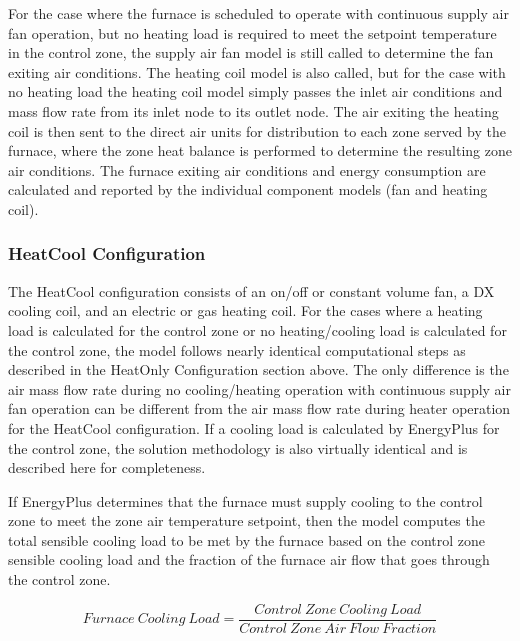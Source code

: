 For the case where the furnace is scheduled to operate with continuous supply air fan operation, but no heating load is required to meet the setpoint temperature in the control zone, the supply air fan model is still called to determine the fan exiting air conditions. The heating coil model is also called, but for the case with no heating load the heating coil model simply passes the inlet air conditions and mass flow rate from its inlet node to its outlet node. The air exiting the heating coil is then sent to the direct air units for distribution to each zone served by the furnace, where the zone heat balance is performed to determine the resulting zone air conditions. The furnace exiting air conditions and energy consumption are calculated and reported by the individual component models (fan and heating coil).

\subsubsection{HeatCool Configuration}\label{heatcool-configuration}

The HeatCool configuration consists of an on/off or constant volume fan, a DX cooling coil, and an electric or gas heating coil. For the cases where a heating load is calculated for the control zone or no heating/cooling load is calculated for the control zone, the model follows nearly identical computational steps as described in the HeatOnly Configuration section above. The only difference is the air mass flow rate during no cooling/heating operation with continuous supply air fan operation can be different from the air mass flow rate during heater operation for the HeatCool configuration. If a cooling load is calculated by EnergyPlus for the control zone, the solution methodology is also virtually identical and is described here for completeness.

If EnergyPlus determines that the furnace must supply cooling to the control zone to meet the zone air temperature setpoint, then the model computes the total sensible cooling load to be met by the furnace based on the control zone sensible cooling load and the fraction of the furnace air flow that goes through the control zone.

\begin{equation}
Furnace~Cooling~Load = \frac{{Control~Zone~Cooling~Load}}{{Control~Zone~Air~Flow~Fraction}}
\end{equation}

